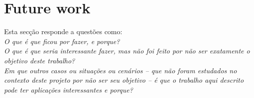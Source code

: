 \documentclass[titlepage,12pt,a4paper,times]{book}
\begin{document}
\section{Future work}
\label{sec:future-work}

Esta secção responde a questões como:\\
\emph{O que é que ficou por fazer, e porque?}\\
\emph{O que é que seria interessante fazer, mas não foi feito por não ser
exatamente o objetivo deste trabalho?}\\
\emph{Em que outros casos ou situações ou cenários -- que não foram estudados
no contexto deste projeto por não ser seu objetivo -- é que o trabalho aqui
descrito pode ter aplicações interessantes e porque?}

% 
% 
% 
% 

\backmatter



\end{document}
